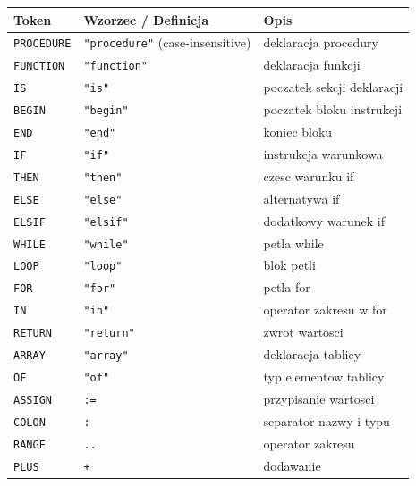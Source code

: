 \documentclass[12pt,a4paper]{article}
\begin{document}
\begin{longtable}{lll}
\toprule
\textbf{Token}   & \textbf{Wzorzec / Definicja}        & \textbf{Opis} \\
\midrule
\endhead
\texttt{PROCEDURE}  & \texttt{"procedure"} (case-insensitive) & deklaracja procedury \\
\texttt{FUNCTION}   & \texttt{"function"}                     & deklaracja funkcji \\
\texttt{IS}         & \texttt{"is"}                           & poczatek sekcji deklaracji \\
\texttt{BEGIN}      & \texttt{"begin"}                        & poczatek bloku instrukcji \\
\texttt{END}        & \texttt{"end"}                          & koniec bloku \\
\texttt{IF}         & \texttt{"if"}                           & instrukcja warunkowa \\
\texttt{THEN}       & \texttt{"then"}                         & czesc warunku if \\
\texttt{ELSE}       & \texttt{"else"}                         & alternatywa if \\
\texttt{ELSIF}      & \texttt{"elsif"}                        & dodatkowy warunek if \\
\texttt{WHILE}      & \texttt{"while"}                        & petla while \\
\texttt{LOOP}       & \texttt{"loop"}                         & blok petli \\
\texttt{FOR}        & \texttt{"for"}                          & petla for \\
\texttt{IN}         & \texttt{"in"}                           & operator zakresu w for \\
\texttt{RETURN}     & \texttt{"return"}                       & zwrot wartosci \\
\texttt{ARRAY}      & \texttt{"array"}                        & deklaracja tablicy \\
\texttt{OF}         & \texttt{"of"}                           & typ elementow tablicy \\
\texttt{ASSIGN}     & \texttt{:=}                             & przypisanie wartosci \\
\texttt{COLON}      & \texttt{:}                              & separator nazwy i typu \\
\texttt{RANGE}      & \texttt{..}                             & operator zakresu \\
\texttt{PLUS}       & \texttt{+}                              & dodawanie \\

\end{longtable}
\end{document}
